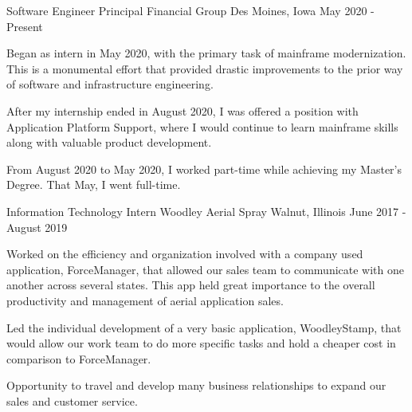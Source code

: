 \begin{cventries}
    \cventry
    {Software Engineer} %
    {Principal Financial Group} %
    {Des Moines, Iowa} %
    {May 2020 - Present} %
    {
      \begin{cvitems} %
        \item {Began as intern in May 2020, with the primary task of mainframe  modernization. This is a monumental effort that provided drastic         improvements to the prior way of software and infrastructure             engineering.}
        \item {After my internship ended in August 2020, I was offered a position with Application Platform Support, where I would continue to learn       mainframe skills along with valuable product development.}
        \item {From August 2020 to May 2020, I worked part-time while 
        achieving my Master's Degree. That May, I went full-time.}
      \end{cvitems}
    }
    
    \cventry
    {Information Technology Intern} %
    {Woodley Aerial Spray} %
    {Walnut, Illinois} %
    {June 2017 - August 2019} %
    {
      \begin{cvitems} %
        \item {Worked on the efficiency and organization involved with a company used application, ForceManager, that allowed our sales team to           communicate with one another across several states. This app held        great importance to the overall productivity and management of aerial application sales.}
        \item {Led the individual development of a very basic application,      WoodleyStamp, that would allow our work team to do more specific         tasks and hold a cheaper cost in comparison to ForceManager.}
        \item {Opportunity to travel and develop many business relationships to expand our sales and customer service.}
      \end{cvitems}
    }
    

\end{cventries}

